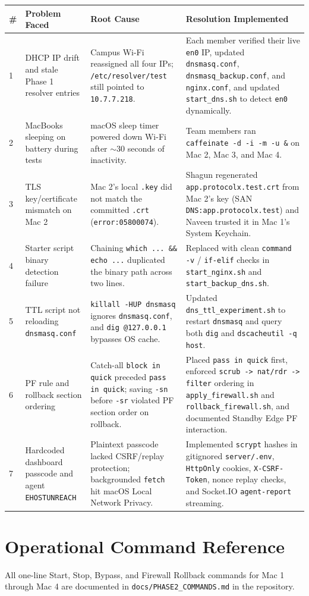 \documentclass[11pt,a4paper]{article}
\begin{document}
\begin{longtable}{@{}p{0.5cm} p{3.8cm} p{4.6cm} p{5.5cm}@{}}
\toprule
\textbf{\#} & \textbf{Problem Faced} & \textbf{Root Cause} & \textbf{Resolution Implemented} \\
\midrule
\endhead
1 & DHCP IP drift and stale Phase 1 resolver entries & Campus Wi-Fi reassigned all four IPs; \texttt{/etc/resolver/test} still pointed to \texttt{10.7.7.218}. & Each member verified their live \texttt{en0} IP, updated \texttt{dnsmasq.conf}, \texttt{dnsmasq\_backup.conf}, and \texttt{nginx.conf}, and updated \texttt{start\_dns.sh} to detect \texttt{en0} dynamically. \\
2 & MacBooks sleeping on battery during tests & macOS sleep timer powered down Wi-Fi after $\sim$30 seconds of inactivity. & Team members ran \texttt{caffeinate -d -i -m -u \&} on Mac 2, Mac 3, and Mac 4. \\
3 & TLS key/certificate mismatch on Mac 2 & Mac 2's local \texttt{.key} did not match the committed \texttt{.crt} (\texttt{error:05800074}). & Shagun regenerated \texttt{app.protocolx.test.crt} from Mac 2's key (SAN \texttt{DNS:app.protocolx.test}) and Naveen trusted it in Mac 1's System Keychain. \\
4 & Starter script binary detection failure & Chaining \texttt{which ... \&\& echo ...} duplicated the binary path across two lines. & Replaced with clean \texttt{command -v} / \texttt{if-elif} checks in \texttt{start\_nginx.sh} and \texttt{start\_backup\_dns.sh}. \\
5 & TTL script not reloading \texttt{dnsmasq.conf} & \texttt{killall -HUP dnsmasq} ignores \texttt{dnsmasq.conf}, and \texttt{dig @127.0.0.1} bypasses OS cache. & Updated \texttt{dns\_ttl\_experiment.sh} to restart \texttt{dnsmasq} and query both \texttt{dig} and \texttt{dscacheutil -q host}. \\
6 & PF rule and rollback section ordering & Catch-all \texttt{block in quick} preceded \texttt{pass in quick}; saving \texttt{-sn} before \texttt{-sr} violated PF section order on rollback. & Placed \texttt{pass in quick} first, enforced \texttt{scrub -> nat/rdr -> filter} ordering in \texttt{apply\_firewall.sh} and \texttt{rollback\_firewall.sh}, and documented Standby Edge PF interaction. \\
7 & Hardcoded dashboard passcode and agent \texttt{EHOSTUNREACH} & Plaintext passcode lacked CSRF/replay protection; backgrounded \texttt{fetch} hit macOS Local Network Privacy. & Implemented \texttt{scrypt} hashes in gitignored \texttt{server/.env}, \texttt{HttpOnly} cookies, \texttt{X-CSRF-Token}, nonce replay checks, and Socket.IO \texttt{agent-report} streaming. \\
\bottomrule
\end{longtable}

\section{Operational Command Reference}
All one-line Start, Stop, Bypass, and Firewall Rollback commands for Mac 1 through Mac 4 are documented in \texttt{docs/PHASE2\_COMMANDS.md} in the repository.
\end{document}
